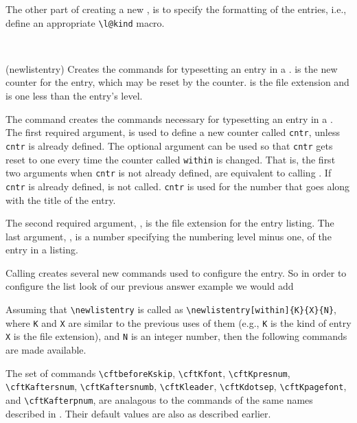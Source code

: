    The other part of creating a new \listofx, is to specify the 
formatting of the entries, i.e., define an appropriate \verb?\l@kind? 
macro.

\begin{syntax}
\cmd{\newlistentry} \\
\end{syntax}
\glossary(newlistentry)%
  {}%
  {Creates the commands for typesetting an entry in a \listofx.
    is the new counter for the entry, which may be reset
   by the  counter.  is the file extension
   and  is one less than the entry's level.}

 The command \cmd{\newlistentry} creates the commands necessary for
typesetting an entry in a \listofx.
 The first required argument,  is used to define a new
 counter called \texttt{cntr}, unless \texttt{cntr} is already defined. 
The optional  argument can be used so that \texttt{cntr} 
gets reset to one every time the counter called \texttt{within} is changed. 
That is, the first two arguments when \texttt{cntr} is not
already defined, are equivalent to calling 
\cmd{\newcounter}. If \texttt{cntr} is already
defined, \cmd{\newcounter} is not called. \texttt{cntr} is used for the 
number that goes along with the title of the entry.

The second required argument, , is the file extension for
the entry listing.  The last argument, , is a number
specifying the numbering level minus one, of the entry in a listing.


Calling \cmd{\newlistentry} creates several new commands used to
configure the entry. So in order to configure the list look of  our
previous answer example we would add
\begin{lcode}
\end{lcode}

Assuming that \verb?\newlistentry? is called as
 \verb?\newlistentry[within]{K}{X}{N}?, where \texttt{K} and
 \texttt{X} are similar to the previous uses of them (e.g., \texttt{K}
 is the kind of entry \texttt{X} is the file extension), and
 \texttt{N} is an integer number, then the following commands are made
 available.


  The set of commands \verb?\cftbeforeKskip?, 
 \verb?\cftKfont?, 
 \verb?\cftKpresnum?, 
 \verb?\cftKaftersnum?, 
 \verb?\cftKaftersnumb?, 
 \verb?\cftKleader?, 
 \verb?\cftKdotsep?, 
 \verb?\cftKpagefont?, and
 \verb?\cftKafterpnum?,
 are analagous to the commands of the same names
 described in . Their default values are also
 as described earlier.

